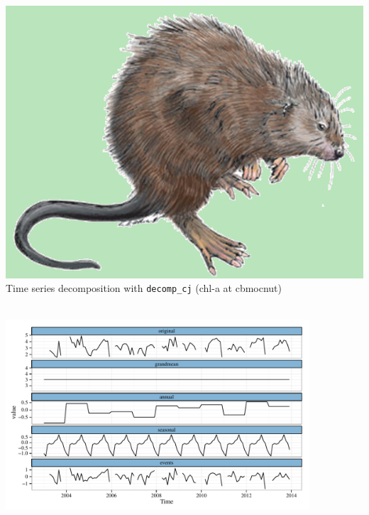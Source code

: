 \documentclass[serif]{beamer}\usepackage[]{graphicx}\usepackage[]{color}
\newenvironment{knitrout}{}{} %
\begin{document}
\begin{frame}[fragile]{\includegraphics[width=0.05\paperwidth]{fig/muskrat.png}\hspace{0.07in}{\bf SWMPrats.net: The SWMPr package}}
Time series decomposition with \texttt{decomp\_cj} (chl-a at cbmocnut)\\~\\
\begin{knitrout}
\color{fgcolor}

{\centering \includegraphics[width=0.85\textwidth]{fig/decomp_dep-1} 

}



\end{knitrout}
\end{frame}
\end{document}
